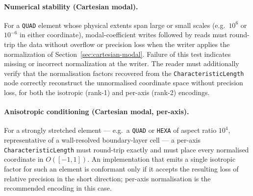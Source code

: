 \documentclass[11pt,letterpaper]{article}
\begin{document}
\paragraph{Numerical stability (Cartesian modal).}
For a \texttt{QUAD} element whose physical extents span large or small scales (e.g.\
$10^{6}$ or $10^{-6}$ in either coordinate), modal-coefficient writes followed by reads
must round-trip the data without overflow or precision loss when the writer applies
the normalization of Section~\ref{sec:cartesian-modal}.  Failure of this test indicates
missing or incorrect normalization at the writer.  The reader must additionally verify
that the normalisation factors recovered from the \texttt{CharacteristicLength} node
correctly reconstruct the unnormalised coordinate space without precision loss, for
both the isotropic (rank-1) and per-axis (rank-2) encodings.

\paragraph{Anisotropic conditioning (Cartesian modal, per-axis).}
For a strongly stretched element --- e.g.\ a \texttt{QUAD} or \texttt{HEXA} of aspect
ratio $10^{4}$, representative of a wall-resolved boundary-layer cell --- a per-axis
\texttt{CharacteristicLength} must round-trip exactly and must place every normalised
coordinate in $O([-1,1])$.  An implementation that emits a single isotropic factor for
such an element is conformant only if it accepts the resulting loss of relative
precision in the short direction; per-axis normalisation is the recommended encoding
in this case.
\end{document}
